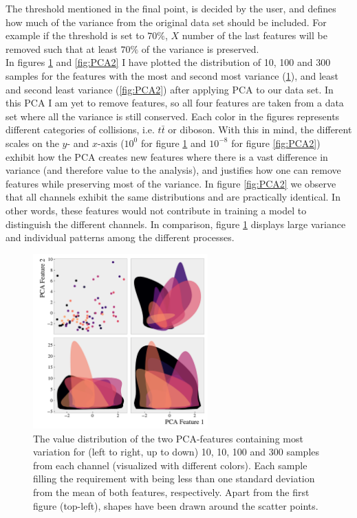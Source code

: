 The threshold mentioned in the final point, is decided by the user, and defines how much of the variance from the original data 
set should be included. For example if the threshold is set to $70\%$, $X$ number of the last features will be removed such 
that at least $70\%$ of the variance is preserved.
\\
In figures \ref{fig:PCA1} and \ref{fig:PCA2} I have plotted the distribution of 10, 100 and 300 samples 
for the features with the most and second most variance (\ref{fig:PCA1}), and least and second least 
variance (\ref{fig:PCA2}) after applying \ac{PCA} to our data set. In this \ac{PCA} I am yet to remove features, 
so all four features are taken from a data set where all the variance is still conserved. Each color in the figures 
represents different categories of collisions, i.e. $t\bar{t}$ or diboson. With this in 
mind, the different scales on the $y$- and $x$-axis ($10^0$ for figure \ref{fig:PCA1} and $10^{-8}$ for figure 
\ref{fig:PCA2}) exhibit how the \ac{PCA} creates new features where there is a vast difference in variance 
(and therefore value to the analysis), and justifies how one can remove features while preserving most of the variance. 
In figure \ref{fig:PCA2} we observe that all channels exhibit the same distributions and are practically identical. 
In other words, these features would not contribute in training a model to distinguish the different channels. 
In comparison, figure \ref{fig:PCA1} displays large variance and individual patterns among the different processes.
\begin{figure}
    \centering
    \includegraphics[width=0.6\textwidth]{Figures/MLResults/DataHandling/PCA/PCAPlotFirst.pdf}
    \caption[The value distribution of the two leading \acs{PCA}-features.]{The value distribution of 
    the two \ac{PCA}-features containing most variation for (left to right, up to down) 10, 10, 100 and 
    300 samples from each channel (visualized with different colors). Each sample filling the requirement with being less than one standard 
    deviation from the mean of both features, respectively. Apart from the first figure (top-left), shapes have been drawn around the scatter 
    points.}
    \label{fig:PCA1}
\end{figure}

